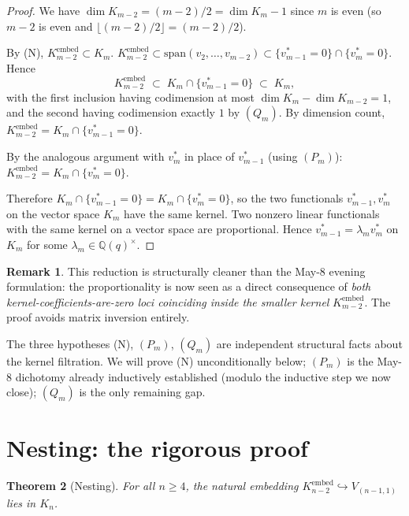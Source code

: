 \documentclass[11pt]{article}
\newtheorem{theorem}{Theorem}
\theoremstyle{definition}
\newtheorem{remark}[theorem]{Remark}
\begin{document}
\begin{proof}
We have $\dim K_{m-2} = (m-2)/2 = \dim K_m - 1$ since $m$ is even
(so $m-2$ is even and $\lfloor (m-2)/2 \rfloor = (m-2)/2$).

By (N), $K_{m-2}^{\mathrm{embed}} \subset K_m$.
$K_{m-2}^{\mathrm{embed}} \subset \mathrm{span}(v_2,\ldots,v_{m-2})
\subset \{v_{m-1}^* = 0\} \cap \{v_m^* = 0\}$. Hence
\[
   K_{m-2}^{\mathrm{embed}}
     \;\subset\; K_m \cap \{v_{m-1}^*=0\}
     \;\subset\; K_m,
\]
with the first inclusion having codimension at most $\dim K_m - \dim K_{m-2} = 1$,
and the second having codimension exactly $1$ by $(Q_m)$.
By dimension count, $K_{m-2}^{\mathrm{embed}} = K_m \cap \{v_{m-1}^*=0\}$.

By the analogous argument with $v_m^*$ in place of $v_{m-1}^*$
(using $(P_m)$):
$K_{m-2}^{\mathrm{embed}} = K_m \cap \{v_m^* = 0\}$.

Therefore $K_m \cap \{v_{m-1}^* = 0\} = K_m \cap \{v_m^* = 0\}$, so
the two functionals $v_{m-1}^*, v_m^*$ on the vector space $K_m$
have the same kernel. Two nonzero linear functionals with the same
kernel on a vector space are proportional. Hence
$v_{m-1}^* = \lambda_m v_m^*$ on $K_m$ for some $\lambda_m \in
\mathbb{Q}(q)^\times$. \qedhere
\end{proof}

\begin{remark}\label{rem:reduction-content}
This reduction is structurally cleaner than the May-8 evening
formulation: the proportionality is now seen as a direct consequence
of \emph{both kernel-coefficients-are-zero loci coinciding inside
the smaller kernel} $K_{m-2}^{\mathrm{embed}}$. The proof avoids
matrix inversion entirely.

The three hypotheses (N), $(P_m)$, $(Q_m)$ are independent
structural facts about the kernel filtration. We will prove (N)
unconditionally below; $(P_m)$ is the May-8 dichotomy already
inductively established (modulo the inductive step we now close);
$(Q_m)$ is the only remaining gap.
\end{remark}

\section{Nesting: the rigorous proof}\label{sec:nesting}

\begin{theorem}[Nesting]\label{thm:nesting}
For all $n \ge 4$, the natural embedding
$K_{n-2}^{\mathrm{embed}} \hookrightarrow V_{(n-1,1)}$ lies in $K_n$.
\end{theorem}
\end{document}
